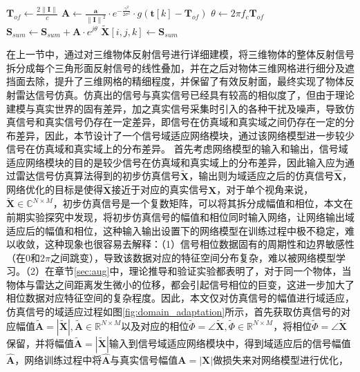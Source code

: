 \begin{algorithm}[H]
\begin{algorithmic}[1]
                    \State $\mathbf{T}_{of} \gets \frac{2\|\mathbf{I}\|}{c}$    
                    \State $\mathbf{A} \gets \frac{\mathbf{a}}{{\|\mathbf{I}\|}^2}\cdot e^{-\frac{\gamma^2}{2{\sigma}^2}}\cdot g(\mathbf{t}[k]-\mathbf{T}_{of})$    
                    \State $\theta \gets 2\pi f_c \mathbf{T}_{of}$
                    \State $\mathbf{S}_{sum} \gets \mathbf{S}_{sum}+\mathbf{A}\cdot e^{j\theta}$ 
                \EndFor
                \State $\tilde{\mathbf{X}}[i,j,k] \gets \mathbf{S}_{sum}$ 
            \EndFor
        \EndFor
    \EndFor
\end{algorithmic}
\end{algorithm}

\label{sec:refiner}
在上一节中，通过对三维物体反射信号进行详细建模，将三维物体的整体反射信号拆分成每个三角形面反射信号的线性叠加，并在之后对物体三维网格进行细分及遮挡面去除，提升了三维网格的精细程度，并保留了有效反射面，最终实现了物体反射雷达信号仿真。仿真出的信号与真实信号已经具有较高的相似度了，但由于理论建模与真实世界的固有差异，加之真实信号采集时引入的各种干扰及噪声，导致仿真信号和真实信号仍存在一定差异，即信号在仿真域和真实域之间仍存在一定的分布差异，因此，本节设计了一个信号域适应网络模块，通过该网络模型进一步较少信号在仿真域和真实域上的分布差异。
首先考虑网络模型的输入和输出，信号域适应网络模块的目的是较少信号在仿真域和真实域上的分布差异，因此输入应为通过雷达信号仿真算法得到的初步仿真信号$\tilde{\mathbf{X}}$，输出则为域适应之后的仿真信号$\hat{\mathbf{X}}$，网络优化的目标是使得$\hat{\mathbf{X}}$接近于对应的真实信号$\mathbf{X}$，对于单个视角来说，$\tilde{\mathbf{X}}\in \mathbb{C}^{N\times M}$，初步仿真信号是一个复数矩阵，可以将其拆分成幅值和相位，本文在前期实验探究中发现，将初步仿真信号的幅值和相位同时输入网络，让网络输出域适应后的幅值和相位，这种输入输出设置下的网络模型在训练过程中极不稳定，难以收敛，这种现象也很容易去解释：（1）信号相位数据固有的周期性和边界敏感性（在$0$和$2\pi$之间跳变），导致该数据对应的特征空间分布复杂，难以被网络模型学习。（2）在章节\ref{sec:aug}中，理论推导和验证实验都表明了，对于同一个物体，当物体与雷达之间距离发生微小的位移，都会引起信号相位的巨变，这进一步加大了相位数据对应特征空间的复杂程度。因此，本文仅对仿真信号的幅值进行域适应，仿真信号的域适应过程如图\ref{fig:domain_adaptation}所示，首先获取仿真信号的对应幅值$\tilde{\mathbf{A}} = |\tilde{\mathbf{X}}|, \tilde{\mathbf{A}}\in\mathbb{R}^{N\times M}$以及对应的相位$\tilde{\Phi} = \angle \tilde{\mathbf{X}}, \tilde{\Phi}\in \mathbb{R}^{N\times M}$，将相位$\tilde{\Phi} = \angle \tilde{\mathbf{X}}$保留，并将幅值$\tilde{\mathbf{A}} = |\tilde{\mathbf{X}}|$输入到信号域适应网络模块中，得到域适应后的信号幅值$\hat{\mathbf{A}}$，网络训练过程中将$\hat{\mathbf{A}}$与真实信号幅值$\mathbf{A} = |\mathbf{X}|$做损失来对网络模型进行优化，
